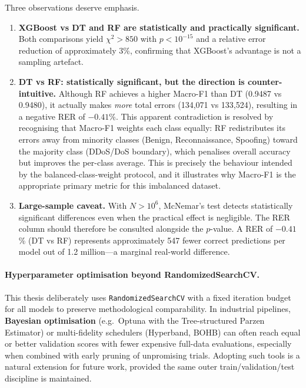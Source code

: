 Three observations deserve emphasis.

\begin{enumerate}[nosep]
  \item \textbf{XGBoost vs DT and RF are statistically and practically significant.} Both comparisons yield $\chi^2 > 850$ with $p < 10^{-15}$ and a relative error reduction of approximately 3\%, confirming that XGBoost's advantage is not a sampling artefact.
  \item \textbf{DT vs RF: statistically significant, but the direction is counter-intuitive.} Although RF achieves a higher Macro-F1 than DT (0.9487 vs 0.9480), it actually makes \emph{more} total errors (134,071 vs 133,524), resulting in a negative RER of $-0.41$\%. This apparent contradiction is resolved by recognising that Macro-F1 weights each class equally: RF redistributes its errors away from minority classes (Benign, Reconnaissance, Spoofing) toward the majority class (DDoS/DoS boundary), which penalises overall accuracy but improves the per-class average. This is precisely the behaviour intended by the balanced-class-weight protocol, and it illustrates why Macro-F1 is the appropriate primary metric for this imbalanced dataset.
  \item \textbf{Large-sample caveat.} With $N > 10^6$, McNemar's test detects statistically significant differences even when the practical effect is negligible. The RER column should therefore be consulted alongside the $p$-value. A RER of $-0.41$\% (DT vs RF) represents approximately 547 fewer correct predictions per model out of 1.2 million---a marginal real-world difference.
\end{enumerate}

\paragraph{Hyperparameter optimisation beyond RandomizedSearchCV.}
This thesis deliberately uses \texttt{RandomizedSearchCV} with a fixed iteration budget for all models to preserve methodological comparability. In industrial pipelines, \textbf{Bayesian optimisation} (e.g.\ Optuna with the Tree-structured Parzen Estimator) or multi-fidelity schedulers (Hyperband, BOHB) can often reach equal or better validation scores with fewer expensive full-data evaluations, especially when combined with early pruning of unpromising trials. Adopting such tools is a natural extension for future work, provided the same outer train/validation/test discipline is maintained.

